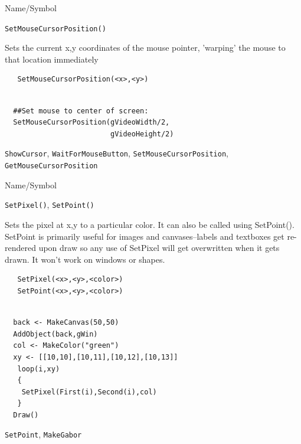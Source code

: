 \begin{desc}{Name/Symbol}
\item[Name/Symbol]	\verb+SetMouseCursorPosition()+

\item[Description] Sets the current x,y coordinates of the mouse
  pointer, 'warping' the mouse to that location immediately

\item[Usage]
\begin{verbatim}
   SetMouseCursorPosition(<x>,<y>)
\end{verbatim}

\item[Example]	
\begin{verbatim}

  ##Set mouse to center of screen:
  SetMouseCursorPosition(gVideoWidth/2,
                         gVideoHeight/2)
\end{verbatim}


\item[See Also]
  \verb+ShowCursor+, \verb+WaitForMouseButton+,
  \verb+SetMouseCursorPosition+, \verb+GetMouseCursorPosition+
\end{desc}

\begin{desc}{Name/Symbol}
\item[Name/Symbol]	\verb+SetPixel()+, \verb+SetPoint()+

\item[Description] Sets the pixel at x,y to a particular color.  It
  can also be called using SetPoint().  SetPoint is primarily useful
  for images and canvases--labels and textboxes get re-rendered upon
  draw so any use of SetPixel will get overwritten when it gets
  drawn.  It won't work on windows or shapes.

\item[Usage]
\begin{verbatim}
   SetPixel(<x>,<y>,<color>)
   SetPoint(<x>,<y>,<color>)
\end{verbatim}

\item[Example]	
\begin{verbatim}

  back <- MakeCanvas(50,50)
  AddObject(back,gWin)
  col <- MakeColor("green")
  xy <- [[10,10],[10,11],[10,12],[10,13]]
   loop(i,xy)
   {
    SetPixel(First(i),Second(i),col)
   }
  Draw()
\end{verbatim}


\item[See Also]
  \verb+SetPoint+, \verb+MakeGabor+
\end{desc}



